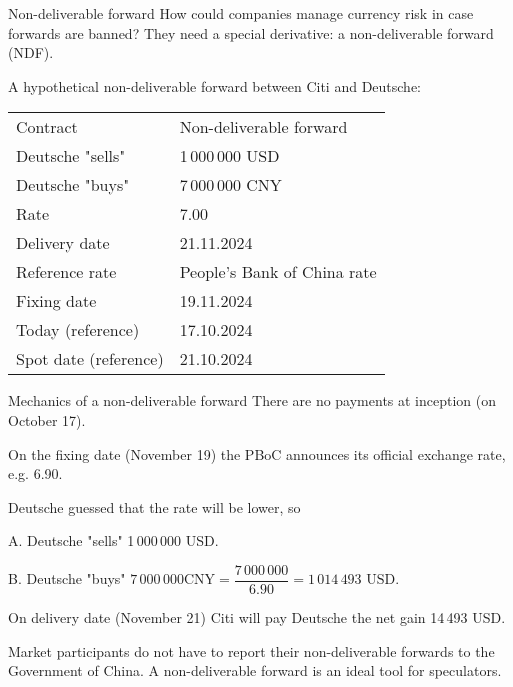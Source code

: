\documentclass{beamer}
\begin{document}
\begin{frame}{Non-deliverable forward}
\justify
How could companies manage currency risk in case forwards are banned? They need a special derivative: a \alert{non-deliverable forward (NDF)}.

\justify
A hypothetical non-deliverable forward between Citi and Deutsche:

\justify
\centering
\begin{tabular}{l|l}
	Contract & Non-deliverable forward		\\
	Deutsche "sells"  & 1\,000\,000 USD	\\
	Deutsche "buys" & 7\,000\,000 CNY		\\
	Rate		 		      & 7.00 						\\
	Delivery date	   & 21.11.2024 \\
	Reference rate	   & People's Bank of China rate	\\
	Fixing date		   & 19.11.2024 \\
	Today (reference)	& 17.10.2024 \\
	Spot date (reference) & 21.10.2024
\end{tabular}
\end{frame}



\begin{frame}{Mechanics of a non-deliverable forward}
\justify
There are no payments at inception (on October 17).

\justify
On the fixing date (November 19) the PBoC announces its official exchange rate, e.g. 6.90.

\justify
Deutsche guessed that the rate will be lower, so

A. Deutsche "sells" 1\,000\,000 USD.

B. Deutsche "buys" $7\,000\,000 \text{CNY} = \dfrac{7\,000\,000}{6.90} = 1\,014\,493 \text{ USD}$.

\justify
On delivery date (November 21) Citi will pay Deutsche the net gain 14\,493 USD.

\justify
Market participants do not have to report their non-deliverable forwards to the Government of China. A non-deliverable forward is an ideal tool for speculators.
\end{frame}
\end{document}

